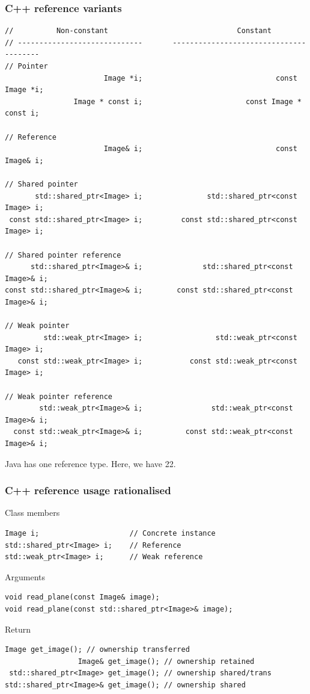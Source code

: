 \documentclass{beamer}
\begin{document}
\begin{frame}[fragile]
  \frametitle{C++ reference variants}
  \begin{lstlisting}[basicstyle=\tiny\ttfamily]
//          Non-constant                              Constant
// -----------------------------       ---------------------------------------
// Pointer
                       Image *i;                               const Image *i;
                Image * const i;                        const Image * const i;

// Reference
                       Image& i;                               const Image& i;

// Shared pointer
       std::shared_ptr<Image> i;               std::shared_ptr<const Image> i;
 const std::shared_ptr<Image> i;         const std::shared_ptr<const Image> i;

// Shared pointer reference
      std::shared_ptr<Image>& i;              std::shared_ptr<const Image>& i;
const std::shared_ptr<Image>& i;        const std::shared_ptr<const Image>& i;

// Weak pointer
         std::weak_ptr<Image> i;                 std::weak_ptr<const Image> i;
   const std::weak_ptr<Image> i;           const std::weak_ptr<const Image> i;

// Weak pointer reference
        std::weak_ptr<Image>& i;                std::weak_ptr<const Image>& i;
  const std::weak_ptr<Image>& i;          const std::weak_ptr<const Image>& i;
\end{lstlisting}
\begin{center}
  Java has one reference type.  Here, we have 22.
\end{center}
\end{frame}

\begin{frame}[fragile]
  \frametitle{C++ reference usage rationalised}
\begin{block}{Class members}
  \begin{lstlisting}[basicstyle=\scriptsize\ttfamily]
Image i;                     // Concrete instance
std::shared_ptr<Image> i;    // Reference
std::weak_ptr<Image> i;      // Weak reference
\end{lstlisting}
\end{block}
\begin{block}{Arguments}
  \begin{lstlisting}[basicstyle=\scriptsize\ttfamily]
void read_plane(const Image& image);
void read_plane(const std::shared_ptr<Image>& image);
\end{lstlisting}
\end{block}
\begin{block}{Return}
  \begin{lstlisting}[basicstyle=\scriptsize\ttfamily]
                  Image get_image(); // ownership transferred
                 Image& get_image(); // ownership retained
 std::shared_ptr<Image> get_image(); // ownership shared/trans
std::shared_ptr<Image>& get_image(); // ownership shared
\end{lstlisting}
\end{block}
\end{frame}
\end{document}
